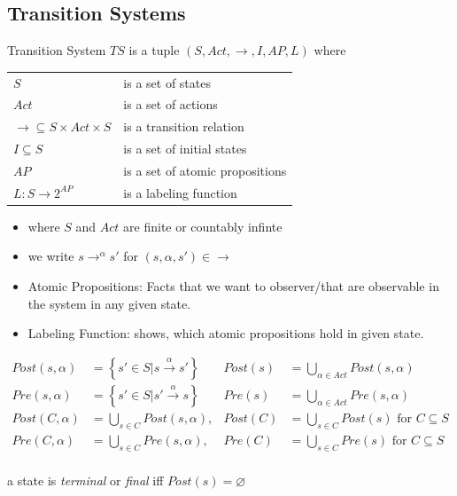 \documentclass[a4paper, 10pt]{article}
\begin{document}
\subsection*{Transition Systems}
\begin{shaded}
Transition System $TS$ is a tuple $(S,Act,\to,I,AP,L)$ where \\
\begin{minipage}{0.48\textwidth}
\begin{tabular}{ll}
$S$ & is a set of states \\
$Act$ & is a set of actions \\
$\to\subseteq S\times Act\times S$ & is a transition relation \\
$I\subseteq S$ & is a set of initial states \\
$AP$ & is a set of atomic propositions \\
$L:S\to2^{AP}$ & is a labeling function \\
\end{tabular}
\end{minipage}
\hfill \vrule \hfill
\begin{minipage}{0.48\textwidth}
\begin{itemize}
    \item where $S$ and $Act$ are finite or countably infinte
    \item we write $s\to^\alpha s'$ for $\left(s,\alpha,s'\right)\in\to$
    \item Atomic Propositions: Facts that we want to observer/that are observable in the system in any given state.
    \item Labeling Function: shows, which atomic propositions hold in given state.
\end{itemize}
\end{minipage}
\end{shaded}

\begin{shaded}
    \begin{align*}
        Post(s,\alpha) &= \left\{ s'\in S | s\overset{\alpha}{\longrightarrow} s' \right\}
        & Post(s)&=\bigcup_{\alpha\in Act} Post(s,\alpha)
        \\
        Pre(s,\alpha) &= \left\{ s'\in S | s'\overset{\alpha}{\longrightarrow} s \right\}
        & Pre(s)&=\bigcup_{\alpha\in Act} Pre(s,\alpha)
        \\
        Post(C,\alpha) &= \bigcup_{s\in C} Post(s,\alpha),
        & Post(C) &= \bigcup_{s\in C} Post(s)\textrm{ for } C\subseteq S
        \\
        Pre(C,\alpha) &= \bigcup_{s\in C} Pre(s,\alpha),
        & Pre(C) &= \bigcup_{s\in C} Pre(s)\textrm{ for } C\subseteq S
        \\
    \end{align*}
    \begin{center}
    a state is \emph{terminal} or \emph{final} iff $Post(s)=\varnothing$
    \end{center}
\end{shaded}
\end{document}
